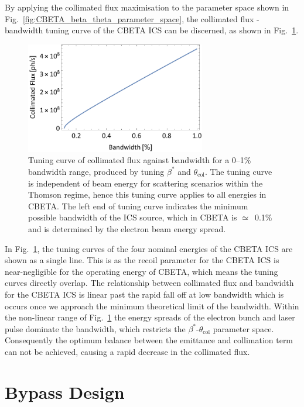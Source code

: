 \documentclass[../main.tex]{subfiles}
\begin{document}
By applying the collimated flux maximisation to the parameter space shown in Fig.~\ref{fig:CBETA_beta_theta_parameter_space}, the collimated flux - bandwidth tuning curve of the CBETA ICS can be discerned, as shown in Fig.~\ref{fig:CBETA_Tuning_Curve}. 
\begin{figure}[!h]
\centering
\includegraphics[width=0.7\textwidth]{Figures/CBETA_Inverse_Compton_Source_Design/CBETATuningCurve.pdf}
\caption{Tuning curve of collimated flux against bandwidth for a 0--1\% bandwidth range, produced by tuning $\beta^{*}$ and $\theta_{\mathrm{col}}$. The tuning curve is independent of beam energy for scattering scenarios within the Thomson regime, hence this tuning curve applies to all energies in CBETA. The left end of tuning curve indicates the minimum possible bandwidth of the ICS source, which in CBETA is $\simeq$~0.1\% and is determined by the electron beam energy spread.}
\label{fig:CBETA_Tuning_Curve}
\end{figure}

In Fig.~\ref{fig:CBETA_Tuning_Curve}, the tuning curves of the four nominal energies of the CBETA ICS are shown as a single line. This is as the recoil parameter for the CBETA ICS is near-negligible for the operating energy of CBETA, which means the tuning curves directly overlap. The relationship between collimated flux and bandwidth for the CBETA ICS is linear past the rapid fall off at low bandwidth which is occurs once we approach the minimum theoretical limit of the bandwidth. Within the non-linear range of Fig.~\ref{fig:CBETA_Tuning_Curve} the energy spreads of the electron bunch and laser pulse dominate the bandwidth, which restricts the $\beta^{*}$-$\theta_{\mathrm{col}}$ parameter space. Consequently the optimum balance between the emittance and collimation term can not be achieved, causing a rapid decrease in the collimated flux.   

\section{Bypass Design}
\end{document}
